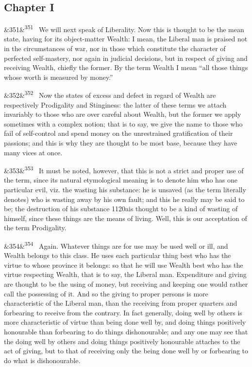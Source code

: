 \documentclass[12pt]{article}
\newcommand{\para}[1][]{\par\noindent\ifx&#1&\else\textsuperscript{\footnotesize #1}~\fi}
\begin{document}
\subsection*{Chapter I}

\para[351] We will next speak of Liberality. Now this is thought to be the mean state, having for its object-matter Wealth: I mean, the Liberal man is praised not in the circumstances of war, nor in those which constitute the character of perfected self-mastery, nor again in judicial decisions, but in respect of giving and receiving Wealth, chiefly the former. By the term Wealth I mean “all those things whose worth is measured by money.”

\para[352] Now the states of excess and defect in regard of Wealth are respectively Prodigality and Stinginess: the latter of these terms we attach invariably to those who are over careful about Wealth, but the former we apply sometimes with a complex notion; that is to say, we give the name to those who fail of self-control and spend money on the unrestrained gratification of their passions; and this is why they are thought to be most base, because they have many vices at once.

\para[353] It must be noted, however, that this is not a strict and proper use of the term, since its natural etymological meaning is to denote him who has one particular evil, viz. the wasting his substance: he is unsaved (as the term literally denotes) who is wasting away by his own fault; and this he really may be said to be; the destruction of his substance 1120ais thought to be a kind of wasting of himself, since these things are the means of living. Well, this is our acceptation of the term Prodigality.

\para[354] Again. Whatever things are for use may be used well or ill, and Wealth belongs to this class. He uses each particular thing best who has the virtue to whose province it belongs: so that he will use Wealth best who has the virtue respecting Wealth, that is to say, the Liberal man. Expenditure and giving are thought to be the using of money, but receiving and keeping one would rather call the possessing of it. And so the giving to proper persons is more characteristic of the Liberal man, than the receiving from proper quarters and forbearing to receive from the contrary. In fact generally, doing well by others is more characteristic of virtue than being done well by, and doing things positively honourable than forbearing to do things dishonourable; and any one may see that the doing well by others and doing things positively honourable attaches to the act of giving, but to that of receiving only the being done well by or forbearing to do what is dishonourable.
\end{document}
